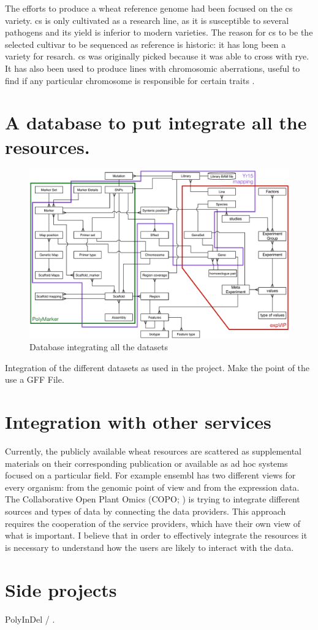 The efforts to produce a wheat reference genome had been focused on the \gls{cs} variety. 
\acrshort{cs} is only cultivated as a research line, as it is susceptible to several pathogens and its yield is inferior to modern varieties.  
The reason for \acrshort{cs} to be the selected cultivar to be sequenced as reference is historic: it has long been a variety  for resarch.
\acrshort{cs} was originally picked because it was able to cross with rye. 
It has also been used to produce lines with chromosomic aberrations, useful to find if any particular chromosome is responsible for certain traits \citep{Sears1985}. 




\section{A database to put integrate all the resources. }

\begin{figure}
\includegraphics[width=1\textwidth]{Conclusions/Figures/CompleteDatabase.pdf}
\caption{Database integrating all the datasets}
\end{figure}
Integration of the different datasets as used in the project. 
Make the point of the use a GFF File. 

\section{Integration with other services}
Currently, the publicly available wheat resources are scattered as supplemental materials on their corresponding publication or available as ad hoc systems focused on a particular field.
For example ensembl has two different views for every organism: from the genomic point of view and from the expression data. 
The Collaborative Open Plant Omics (COPO; \citealt{Davey2015}) is trying to integrate different sources and types of data by connecting the data providers. 
This approach requires the cooperation of the service providers, which have their own view of what is important. 
I believe that in order to effectively integrate the resources it is necessary to understand how the users are likely to interact with the data.

\section{Side projects}

PolyInDel / . 




